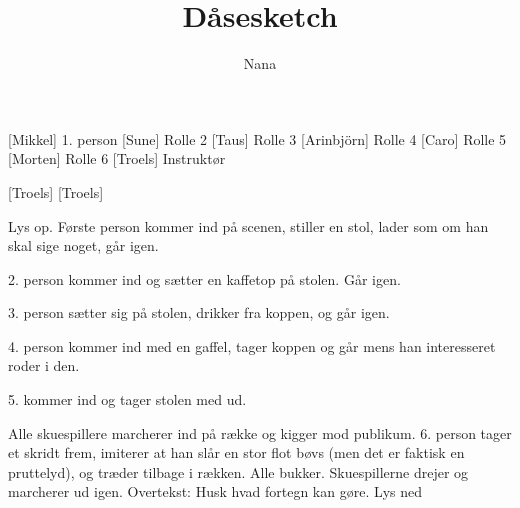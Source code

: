 \documentclass[a4paper,11pt]{article}
\title{Dåsesketch}
\author{Nana}
\begin{document}
\maketitle

\begin{roles}
[Mikkel] 1. person
[Sune] Rolle 2
[Taus] Rolle 3
[Arinbjörn] Rolle 4
[Caro] Rolle 5
[Morten] Rolle 6
[Troels] Instruktør
\end{roles}

\begin{props}
[Troels]
[Troels]
\end{props}

\begin{sketch}

\scene Lys op.
Første person kommer ind på scenen, stiller en stol, lader som om han
skal sige noget, går igen.

2. person kommer ind og sætter en kaffetop på stolen. Går igen.

3. person sætter sig på stolen, drikker fra koppen, og går igen.

4. person kommer ind med en gaffel, tager koppen og går mens han
interesseret roder i den.

5. kommer ind og tager stolen med ud.

Alle skuespillere marcherer ind på række og kigger mod publikum.
6. person tager et skridt frem, imiterer at han slår en stor flot bøvs
(men det er faktisk en pruttelyd), og træder tilbage i rækken.  Alle
bukker.  Skuespillerne drejer og marcherer ud igen.  \scene Overtekst:
Husk hvad fortegn kan gøre.  Lys ned

\end{sketch}
\end{document}
